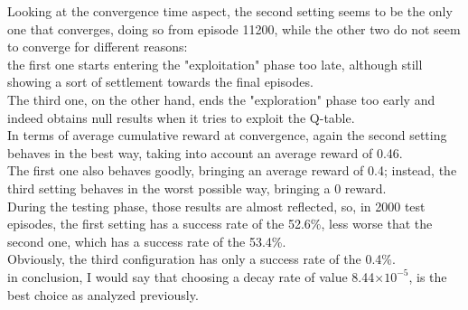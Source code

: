 \documentclass{article}
\begin{document}
\begin{center}
\centering
{}
\end{center}


\begin{center}
\centering
{}
\end{center}


Looking at the convergence time aspect, the second setting seems to be the only one that converges, doing so from episode 11200, while the other two do not seem to converge for different reasons:
\\
the first one starts entering the "exploitation" phase too late, although still showing a sort of settlement towards the final episodes.
\\
The third one, on the other hand, ends the "exploration" phase too early and indeed obtains null results when it tries to exploit the Q-table.
\\
In terms of average cumulative reward at convergence, again the second setting behaves in the best way, taking into account an average reward of 0.46.
\\
The first one also behaves goodly, bringing an average reward of 0.4; instead, the third setting behaves in the worst possible way, bringing a 0 reward.
\\
During the testing phase, those results are almost reflected, so, in 2000 test episodes, the first setting has a success rate of the 52.6\%, less worse that the second one, which has a success rate of the 53.4\%.
\\
Obviously, the third configuration has only a success rate of the 0.4\%.
\\
in conclusion, I would say that choosing a decay rate of value 8.44$\times10^{-5}$, is the best choice as analyzed previously.
\end{document}
